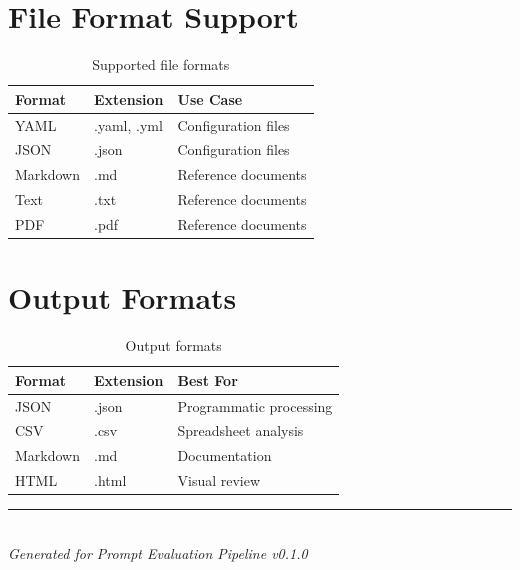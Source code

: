 \documentclass[11pt,a4paper]{report}
\begin{document}
\section{File Format Support}

\begin{table}[h]
\centering
\begin{tabular}{@{}llp{6cm}@{}}
\toprule
\textbf{Format} & \textbf{Extension} & \textbf{Use Case} \\
\midrule
YAML & .yaml, .yml & Configuration files \\
JSON & .json & Configuration files \\
Markdown & .md & Reference documents \\
Text & .txt & Reference documents \\
PDF & .pdf & Reference documents \\
\bottomrule
\end{tabular}
\caption{Supported file formats}
\end{table}

\section{Output Formats}

\begin{table}[h]
\centering
\begin{tabular}{@{}llp{6cm}@{}}
\toprule
\textbf{Format} & \textbf{Extension} & \textbf{Best For} \\
\midrule
JSON & .json & Programmatic processing \\
CSV & .csv & Spreadsheet analysis \\
Markdown & .md & Documentation \\
HTML & .html & Visual review \\
\bottomrule
\end{tabular}
\caption{Output formats}
\end{table}

\vfill

\begin{center}
\rule{0.5\textwidth}{0.4pt}\\[0.5cm]
\textit{Generated for Prompt Evaluation Pipeline v0.1.0}
\end{center}
\end{document}
